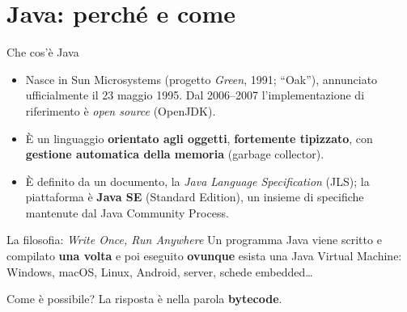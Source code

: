 \documentclass[10pt,aspectratio=169]{beamer}
\begin{document}
\section{Java: perché e come}

\begin{frame}{Che cos'è Java}
\begin{itemize}
    \item Nasce in Sun Microsystems (progetto \emph{Green}, 1991; ``Oak''), annunciato ufficialmente il 23 maggio 1995. Dal 2006--2007 l'implementazione di riferimento è \emph{open source} (OpenJDK).
    \item È un linguaggio \textbf{orientato agli oggetti}, \textbf{fortemente tipizzato}, con \textbf{gestione automatica della memoria} (garbage collector).
    \item È definito da un documento, la \emph{Java Language Specification} (JLS); la piattaforma è \textbf{Java SE} (Standard Edition), un insieme di specifiche mantenute dal Java Community Process.
\end{itemize}

\vspace{0.2cm}
\begin{block}{La filosofia: \emph{Write Once, Run Anywhere}}
Un programma Java viene scritto e compilato \textbf{una volta} e poi eseguito \textbf{ovunque} esista una Java Virtual Machine: Windows, macOS, Linux, Android, server, schede embedded\ldots
\end{block}

\vspace{0.2cm}
\small Come è possibile? La risposta è nella parola \textbf{bytecode}.
\end{frame}
\end{document}
